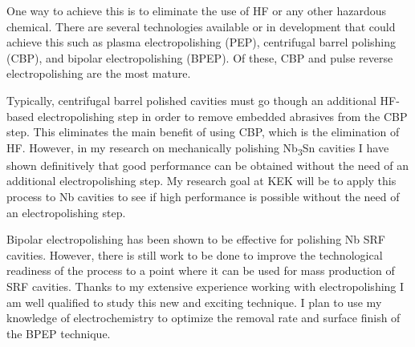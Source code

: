 \documentclass[]{revtex4-2}
\begin{document}
    One way to achieve this is to eliminate the use of HF or any other hazardous chemical. There are several technologies available or in development that could achieve this such as plasma electropolishing (PEP), centrifugal barrel polishing (CBP), and bipolar electropolishing (BPEP). Of these, CBP and pulse reverse electropolishing are the most mature.

    Typically, centrifugal barrel polished cavities must go though an additional HF-based electropolishing step in order to remove embedded abrasives from the CBP step. This eliminates the main benefit of using CBP, which is the elimination of HF. However, in my research on mechanically polishing Nb\textsubscript{3}Sn cavities I have shown definitively that good performance can be obtained without the need of an additional electropolishing step. My research goal at KEK will be to apply this process to Nb cavities to see if high performance is possible without the need of an electropolishing step.

    Bipolar electropolishing has been shown to be effective for polishing Nb SRF cavities. However, there is still work to be done to improve the technological readiness of the process to a point where it can be used for mass production of SRF cavities. Thanks to my extensive experience working with electropolishing I am well qualified to study this new and exciting technique. I plan to use my knowledge of electrochemistry to optimize the removal rate and surface finish of the BPEP technique. 



\end{document}
